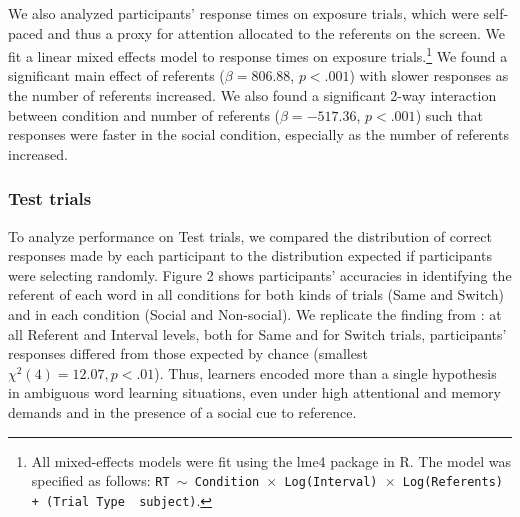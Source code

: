 \documentclass[10pt,letterpaper]{article}
\begin{document}
We also analyzed participants' response times on exposure trials, which were self-paced and thus a proxy for attention allocated to the referents on the screen. We fit a linear mixed effects  model to response times on exposure trials.\footnote{All mixed-effects models were fit using the lme4 package in R. The model was specified as follows: \texttt{RT $\sim$ Condition~$\times$~Log(Interval)~$\times$~Log(Referents) + (Trial Type \textbar~subject)}.} We found a significant main effect of referents ($\beta=  806.88$, $p< .001$) with slower responses as the number of referents increased. We also found a significant 2-way interaction between condition and number of referents ($\beta=  -517.36$, $p< .001$) such that responses were faster in the social condition, especially as the number of referents increased.


\subsubsection{Test trials}

To analyze performance on Test trials, we compared the distribution of correct responses made by each participant to the distribution expected if participants were selecting randomly. Figure 2 shows participants' accuracies in identifying the referent of each word in all conditions for both kinds of trials (Same and Switch) and in each condition (Social and Non-social). We replicate the finding from : at all Referent and Interval levels, both for Same and for Switch trials, participants' responses differed from those expected by chance (smallest $\chi^{2}(4) = 12.07, p < .01$). Thus, learners encoded more than a single hypothesis in ambiguous word learning situations, even under high attentional and memory demands and in the presence of a social cue to reference. 
\end{document}
